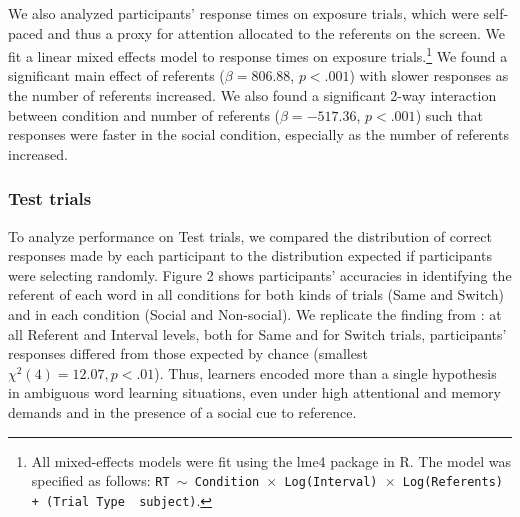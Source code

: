 \documentclass[10pt,letterpaper]{article}
\begin{document}
We also analyzed participants' response times on exposure trials, which were self-paced and thus a proxy for attention allocated to the referents on the screen. We fit a linear mixed effects  model to response times on exposure trials.\footnote{All mixed-effects models were fit using the lme4 package in R. The model was specified as follows: \texttt{RT $\sim$ Condition~$\times$~Log(Interval)~$\times$~Log(Referents) + (Trial Type \textbar~subject)}.} We found a significant main effect of referents ($\beta=  806.88$, $p< .001$) with slower responses as the number of referents increased. We also found a significant 2-way interaction between condition and number of referents ($\beta=  -517.36$, $p< .001$) such that responses were faster in the social condition, especially as the number of referents increased.


\subsubsection{Test trials}

To analyze performance on Test trials, we compared the distribution of correct responses made by each participant to the distribution expected if participants were selecting randomly. Figure 2 shows participants' accuracies in identifying the referent of each word in all conditions for both kinds of trials (Same and Switch) and in each condition (Social and Non-social). We replicate the finding from : at all Referent and Interval levels, both for Same and for Switch trials, participants' responses differed from those expected by chance (smallest $\chi^{2}(4) = 12.07, p < .01$). Thus, learners encoded more than a single hypothesis in ambiguous word learning situations, even under high attentional and memory demands and in the presence of a social cue to reference. 
\end{document}
